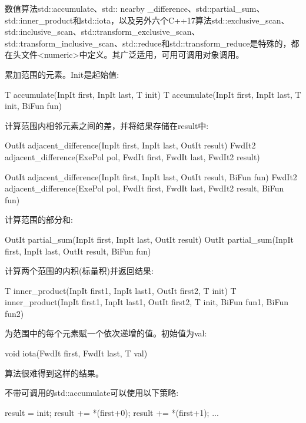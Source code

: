 数值算法std::accumulate、std:: nearby \_difference、std::partial\_sum、std::inner\_product和std::iota，以及另外六个C++17算法std::exclusive\_scan、std::inclusive\_scan、std::transform\_exclusive\_scan、std::transform\_inclusive\_scan、std::reduce和std::transform\_reduce是特殊的，都在头文件<numeric>中定义。其广泛适用，可用可调用对象调用。

累加范围的元素。Init是起始值:

\begin{cpp}
T accumulate(InpIt first, InpIt last, T init)
T accumulate(InpIt first, InpIt last, T init, BiFun fun)
\end{cpp}

计算范围内相邻元素之间的差，并将结果存储在result中:

\begin{cpp}
OutIt adjacent_difference(InpIt first, InpIt last, OutIt result)
FwdIt2 adjacent_difference(ExePol pol, FwdIt first, FwdIt last, FwdIt2 result)

OutIt adjacent_difference(InpIt first, InpIt last, OutIt result, BiFun fun)
FwdIt2 adjacent_difference(ExePol pol, FwdIt first, FwdIt last,
						   FwdIt2 result, BiFun fun)
\end{cpp}

计算范围的部分和:

\begin{cpp}
OutIt partial_sum(InpIt first, InpIt last, OutIt result)
OutIt partial_sum(InpIt first, InpIt last, OutIt result, BiFun fun)
\end{cpp}

计算两个范围的内积(标量积)并返回结果:

\begin{cpp}
T inner_product(InpIt first1, InpIt last1, OutIt first2, T init)
T inner_product(InpIt first1, InpIt last1, OutIt first2, T init,
				BiFun fun1, BiFun fun2)
\end{cpp}

为范围中的每个元素赋一个依次递增的值。初始值为val:

\begin{cpp}
void iota(FwdIt first, FwdIt last, T val)
\end{cpp}

算法很难得到这样的结果。

不带可调用的std::accumulate可以使用以下策略:

\begin{cpp}
result = init;
result += *(first+0);
result += *(first+1);
...
\end{cpp}

